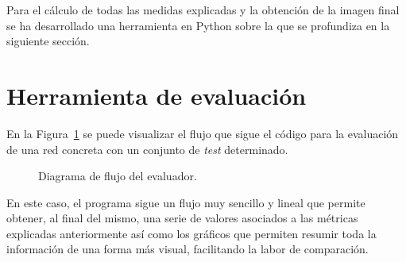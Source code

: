 Para el cálculo de todas las medidas explicadas y la obtención de la imagen final se ha desarrollado una herramienta en Python sobre la que se profundiza en la siguiente sección.

\section{Herramienta de evaluación} \label{sec.eval}

En la Figura~\ref{fig.flujo_test} se puede visualizar el flujo que sigue el código para la evaluación de una red concreta con un conjunto de \textit{test} determinado.

\vspace{10pt}
\begin{figure}[H]
    \begin{center}
        \caption{Diagrama de flujo del evaluador.}
	    \label{fig.flujo_test}
	\end{center}
\end{figure}

En este caso, el programa sigue un flujo muy sencillo y lineal que permite obtener, al final del mismo, una serie de valores asociados a las métricas explicadas anteriormente así como los gráficos que permiten resumir toda la información de una forma más visual, facilitando la labor de comparación.\\

